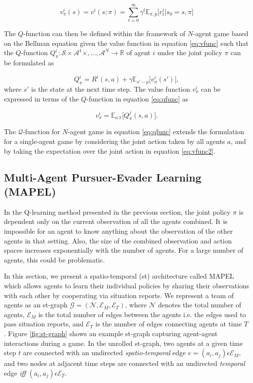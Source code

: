 \documentclass[conference]{IEEEtran}
\begin{document}
\begin{equation}
    v^i_{\pi}(s) = v^i(s;\pi)=\sum_{t=0}^{\infty}\gamma^t\mathbb{E}_{\pi,p} \big[r^i_t|s_0=s,\pi\big]
    \label{eq:vfunc}
\end{equation}

The $Q$-function can then be defined within the framework of $N$-agent game based on the Bellman equation given the value function in equation \eqref{eq:vfunc} such that the $Q$-function $Q^i_{\pi}:\mathcal{S}\times\mathcal{A}^1\times,\dots,\mathcal{A}^N\rightarrow \mathbb{R}$ of agent $i$ under the joint policy $\pi$ can be formulated as

\begin{equation}
    Q^i_{\pi} = R^i(s,a) + \gamma\mathbb{E}_{s'-p}\big[v^i_{\pi}(s')\big],
    \label{eq:qfunc}
\end{equation}
where $s'$ is the state at the next time step. The value function $v^i_{\pi}$ can be expressed in terms of the $Q$-function in equation \eqref{eq:qfunc} as

\begin{equation}
    v^i_{\pi} = \mathbb{E}_{a~\pi}\big[Q^j_{\pi}(s,a)].
    \label{eq:vfunc2}
\end{equation}

The $\mathcal{Q}$-function for $N$-agent game in equation \eqref{eq:qfunc} extends the formulation for a single-agent game by considering the joint action taken by all agents $a$, and by taking the expectation over the joint action in equation \eqref{eq:vfunc2}.


\subsection{Multi-Agent Pursuer-Evader Learning (MAPEL)}


In the Q-learning method presented in the previous section, the joint policy $\pi$ is dependent only on the current observation of all the agents combined. It is impossible for an agent to know anything about the observation of the other agents in that setting. Also, the size of the combined observation and action spaces increases exponentially with the number of agents. For a large number of agents, this could be problematic.

In this section, we present a spatio-temporal (st) architecture called MAPEL which allows agents to learn their individual policies by sharing their observations with each other by cooperating via situation reports. We represent a team of agents as an st-graph $\mathcal{G} = (\mathcal{N},\mathcal{E}_M,\mathcal{E}_T)$, where $\mathcal{N}$ denotes the total number of agents, $\mathcal{E}_M$ is the total number of edges between the agents i.e. the edges used to pass situation reports, and $\mathcal{E}_T$ is the number of edges connecting agents at time $T$. Figure \ref{fig:st-graph} shows an example st-graph capturing agent-agent interactions during a game. In the unrolled st-graph, two agents at a given time step $t$ are connected with an undirected \textit{spatio-temporal} edge $e=(a_i,a_j) \epsilon \mathcal{E}_M$, and two nodes at adjacent time steps are connected with an undirected \textit{temporal} edge \textit{iff} $(a_i,a_j)\epsilon\mathcal{E}_T$.
\end{document}
